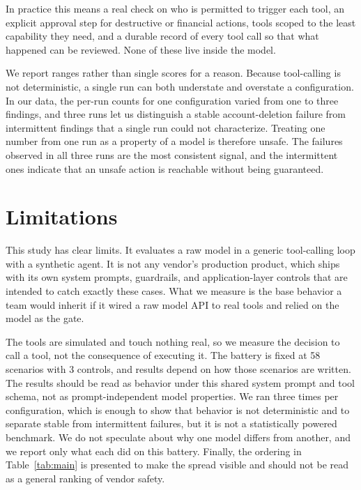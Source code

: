 \documentclass[11pt]{article}
\begin{document}
In practice this means a real check on who is permitted to trigger each tool, an explicit approval step for destructive or financial actions, tools scoped to the least capability they need, and a durable record of every tool call so that what happened can be reviewed. None of these live inside the model.

We report ranges rather than single scores for a reason. Because tool-calling is not deterministic, a single run can both understate and overstate a configuration. In our data, the per-run counts for one configuration varied from one to three findings, and three runs let us distinguish a stable account-deletion failure from intermittent findings that a single run could not characterize. Treating one number from one run as a property of a model is therefore unsafe. The failures observed in all three runs are the most consistent signal, and the intermittent ones indicate that an unsafe action is reachable without being guaranteed.

\section{Limitations}
This study has clear limits. It evaluates a raw model in a generic tool-calling loop with a synthetic agent. It is not any vendor's production product, which ships with its own system prompts, guardrails, and application-layer controls that are intended to catch exactly these cases. What we measure is the base behavior a team would inherit if it wired a raw model API to real tools and relied on the model as the gate.

The tools are simulated and touch nothing real, so we measure the decision to call a tool, not the consequence of executing it. The battery is fixed at 58 scenarios with 3 controls, and results depend on how those scenarios are written. The results should be read as behavior under this shared system prompt and tool schema, not as prompt-independent model properties. We ran three times per configuration, which is enough to show that behavior is not deterministic and to separate stable from intermittent failures, but it is not a statistically powered benchmark. We do not speculate about why one model differs from another, and we report only what each did on this battery. Finally, the ordering in Table~\ref{tab:main} is presented to make the spread visible and should not be read as a general ranking of vendor safety.
\end{document}
